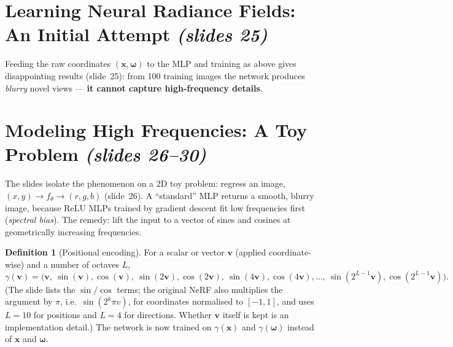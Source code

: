 \documentclass[11pt,a4paper]{article}
\newcommand{\sref}[1]{\texorpdfstring{\emph{(slides #1)}}{(slides #1)}}
\newcommand{\om}{\boldsymbol{\omega}}
\newcommand{\xx}{\boldsymbol{x}}
\theoremstyle{definition}
\newtheorem{definition}{Definition}[section]
\theoremstyle{plain}
\theoremstyle{remark}
\begin{document}

\section{Learning Neural Radiance Fields: An Initial Attempt \sref{25}}

Feeding the raw coordinates $(\xx,\om)$ to the MLP and training as above gives disappointing results (slide~25): from 100 training images the network produces \emph{blurry} novel views --- \textbf{it cannot capture high-frequency details}.


\section{Modeling High Frequencies: A Toy Problem \sref{26--30}}

The slides isolate the phenomenon on a 2D toy problem: regress an image, $(x,y)\to f_\theta\to(r,g,b)$ (slide~26). A ``standard'' MLP returns a smooth, blurry image, because ReLU MLPs trained by gradient descent fit low frequencies first (\emph{spectral bias}). The remedy: lift the input to a vector of sines and cosines at geometrically increasing frequencies.


\begin{definition}[Positional encoding]\label{def:pe}
For a scalar or vector $\boldsymbol v$ (applied coordinate-wise) and a number of octaves $L$,
\[
\gamma(\boldsymbol v)=\big(\boldsymbol v,\ \sin(\boldsymbol v),\cos(\boldsymbol v),\ \sin(2\boldsymbol v),\cos(2\boldsymbol v),\ \sin(4\boldsymbol v),\cos(4\boldsymbol v),\dots,\ \sin(2^{L-1}\boldsymbol v),\cos(2^{L-1}\boldsymbol v)\big).
\]
(The slide lists the $\sin/\cos$ terms; the original NeRF also multiplies the argument by $\pi$, i.e.\ $\sin(2^k\pi v)$, for coordinates normalised to $[-1,1]$, and uses $L=10$ for positions and $L=4$ for directions. Whether $\boldsymbol v$ itself is kept is an implementation detail.) The network is now trained on $\gamma(\xx)$ and $\gamma(\om)$ instead of $\xx$ and $\om$.
\end{definition}
\end{document}
